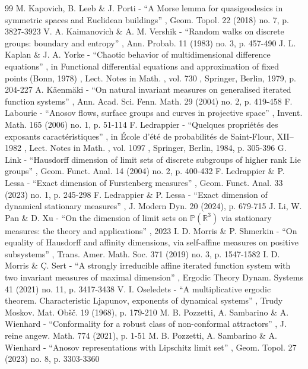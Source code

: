 \begin{thebibliography}{99}
 M. Kapovich, B. Leeb \& J. Porti - “A Morse lemma for quasigeodesics in symmetric spaces and Euclidean buildings” , Geom. Topol. 22 (2018) no. 7, p. 3827-3923
 V. A. Kaimanovich \& A. M. Vershik - “Random walks on discrete groups: boundary and entropy” , Ann. Probab. 11 (1983) no. 3, p. 457-490
 J. L. Kaplan \& J. A. Yorke - “Chaotic behavior of multidimensional difference equations” , in Functional differential equations and approximation of fixed points (Bonn, 1978) , Lect. Notes in Math. , vol. 730 , Springer, Berlin, 1979, p. 204-227
 A. Käenmäki - “On natural invariant measures on generalised iterated function systems” , Ann. Acad. Sci. Fenn. Math. 29 (2004) no. 2, p. 419-458
 F. Labourie - “Anosov flows, surface groups and curves in projective space” , Invent. Math. 165 (2006) no. 1, p. 51-114
 F. Ledrappier - “Quelques propriétés des exposants caractéristiques” , in École d’été de probabilités de Saint-Flour, XII–1982 , Lect. Notes in Math. , vol. 1097 , Springer, Berlin, 1984, p. 305-396
 G. Link - “Hausdorff dimension of limit sets of discrete subgroups of higher rank Lie groups” , Geom. Funct. Anal. 14 (2004) no. 2, p. 400-432
 F. Ledrappier \& P. Lessa - “Exact dimension of Furstenberg measures” , Geom. Funct. Anal. 33 (2023) no. 1, p. 245-298
 F. Ledrappier \& P. Lessa - “Exact dimension of dynamical stationary measures” , J. Modern Dyn. 20 (2024), p. 679-715
 J. Li, W. Pan \& D. Xu - “On the dimension of limit sets on $\mathbb{P} (\mathbb{R}^3)$ via stationary measures: the theory and applications” , 2023
 I. D. Morris \& P. Shmerkin - “On equality of Hausdorff and affinity dimensions, via self-affine measures on positive subsystems” , Trans. Amer. Math. Soc. 371 (2019) no. 3, p. 1547-1582
 I. D. Morris \& Ç. Sert - “A strongly irreducible affine iterated function system with two invariant measures of maximal dimension” , Ergodic Theory Dynam. Systems 41 (2021) no. 11, p. 3417-3438
 V. I. Oseledets - “A multiplicative ergodic theorem. Characteristic Ljapunov, exponents of dynamical systems” , Trudy Moskov. Mat. Obšč. 19 (1968), p. 179-210
 M. B. Pozzetti, A. Sambarino \& A. Wienhard - “Conformality for a robust class of non-conformal attractors” , J. reine angew. Math. 774 (2021), p. 1-51
 M. B. Pozzetti, A. Sambarino \& A. Wienhard - “Anosov representations with Lipschitz limit set” , Geom. Topol. 27 (2023) no. 8, p. 3303-3360

\end{thebibliography}
